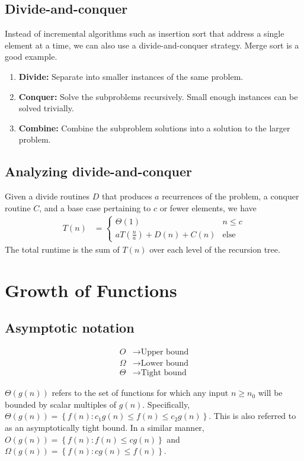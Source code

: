 \documentclass[12pt]{article}
\newcommand{\curly}[1]{\left\{ #1 \right\}}
\newcommand{\round}[1]{\left(  #1 \right)}
\begin{document}
\subsection{Divide-and-conquer}
Instead of incremental algorithms such as insertion sort that address a single element at a time, we can also use a divide-and-conquer strategy. Merge sort is a good example.
\begin{enumerate}
    \item \textbf{Divide:} Separate into smaller instances of the same problem.
    \item \textbf{Conquer:} Solve the subproblems recursively. Small enough instances can be solved trivially.
    \item \textbf{Combine:} Combine the subproblem solutions into a solution to the larger problem.
\end{enumerate}

\subsection{Analyzing divide-and-conquer}
Given a divide routines $D$ that produces $a$ recurrences of the problem, a conquer routine $C$, and a base case pertaining to $c$ or fewer elements, we have
\begin{align*}
    T(n) &= \begin{cases}
        \Theta(1) & n \leq c \\
        aT\round{\frac{n}{a}} + D(n) + C(n) & \text{else}
    \end{cases}
\end{align*}
The total runtime is the sum of $T(n)$ over each level of the recursion tree.

\section{Growth of Functions}

\subsection{Asymptotic notation}
\begin{align*}
    O      &\rightarrow \text{Upper bound} \\
    \Omega &\rightarrow \text{Lower bound} \\
    \Theta &\rightarrow \text{Tight bound}
\end{align*}

$\Theta(g(n))$ refers to the set of functions for which any input $n \geq n_0$ will be bounded by scalar multiples of $g(n)$. Specifically, $\Theta(g(n)) = \curly{f(n) : c_1 g(n) \leq f(n) \leq c_2 g(n)}$. This is also referred to as an asymptotically tight bound. In a similar manner, $O(g(n)) = \curly{f(n) : f(n) \leq c g(n)}$ and $\Omega(g(n)) = \curly{f(n) : c g(n) \leq f(n)}$.
\end{document}
